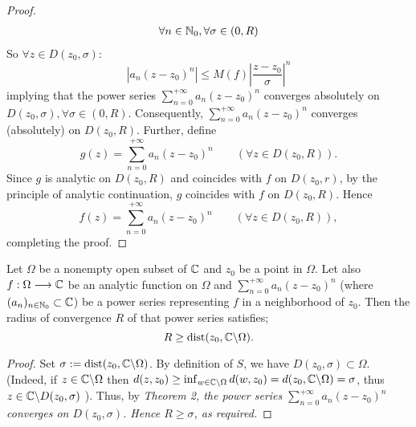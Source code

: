 \begin{proof}
\begin{align*}
        \forall n \in  \mathbb{N}_0, \forall \sigma  \in  (0, R)   
\end{align*}
So $\forall  z \in  D(z_0, \sigma  ): $ 
\[
\left| a_n (z-z_0) ^n  \right|  \leq 
M(f) 
\left| \frac{z-z_0}{\sigma   } \right|  ^n 
\]
implying that the power series $\sum_{n=0}^{+\infty} a_n (z-z_0) ^n $ 
converges absolutely on $D(z_0, \sigma   ) , \forall \sigma  \in   (0, R)$. Consequently, 
$\sum_{n=0}^{+\infty} a_n (z-z_0) ^n $ converges (absolutely) on $D(z_0, R)$.  
Further, define
\[
g(z) = 
\sum_{n=0}^{+\infty} a_n (z-z_0) ^n  \quad 
\quad (\forall  z \in   D(z_0, R) ) .
\]
Since $g$ is analytic on $D(z_0, R) $ and coincides with $f$ on $D(z_0, r) $, by the principle
of analytic continuation, $g$ coincides with $f$ on $D(z_0, R) $. Hence
\[
f(z)  = 
\sum_{n=0}^{+\infty} a_n (z-z_0) ^n  \quad \quad 
(\forall  z \in  D(z_0, R) ),
\]
completing the proof.
\end{proof}
\begin{corollary}[]
Let $\Omega$ be a nonempty open subset of $\mathbb{C} $ and $z_0$ be a point in $\Omega$. Let also
$ f : \Omega \longrightarrow \mathbb{C}  $ be an analytic function on $\Omega$ and 
$\sum_{n=0}^{+\infty} a_n (z-z_0) ^n $ (where $(a_n ) _{n \in  \mathbb{N}_0} \subset \mathbb{C} $) be a power series
representing $f$ in a neighborhood of $z_0$. Then the radius of convergence $R$ of that power series satisfies;
\[
R \geq  \text{dist}  (z_0, \mathbb{C} \backslash \Omega).
\]
\end{corollary}
\begin{proof}
Set $\sigma := \text{dist}  (z_0, \mathbb{C}  \backslash  \Omega) $. By definition of $S$, we have $D(z_0, \sigma   ) \subset \Omega$.
(Indeed, if $z \in  \mathbb{C} \backslash \Omega$ then $d(z, z_0) \geq \inf_{w \in  \mathbb{C} \backslash \Omega} d(w, z_0) = d
(z_0, \mathbb{C} \backslash \Omega) = \sigma    $, thus $z \in  \mathbb{C} \backslash D(z_0, \sigma  ) $ ). Thus, by \it Theorem 2\normalfont, 
the power series $\sum_{n=0}^{+\infty} a_n (z-z_0) ^n $ converges on $D(z_0, \sigma   ) $. Hence $R \geq \sigma $, as required.
\end{proof}
